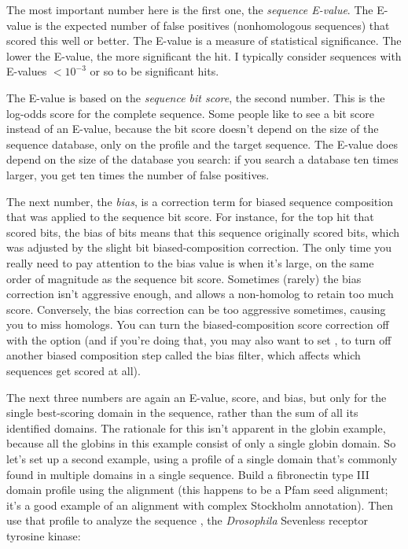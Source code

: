 The most important number here is the first one, the \emph{sequence
  E-value}. The E-value is the expected number of false positives
(nonhomologous sequences) that scored this well or better.  The
E-value is a measure of statistical significance. The lower the
E-value, the more significant the hit.  I typically consider
sequences with E-values $< 10^{-3}$ or so to be significant hits.

The E-value is based on the \emph{sequence bit score}, the second
number. This is the log-odds score for the complete sequence.  Some
people like to see a bit score instead of an E-value, because the bit
score doesn't depend on the size of the sequence database, only on the
profile and the target sequence. The E-value does depend on the
size of the database you search: if you search a database ten times
larger, you get ten times the number of false positives.

The next number, the \emph{bias}, is a correction term for biased
sequence composition that was applied to the sequence bit
score.
For instance, for the top hit \mono{\SGUseqname{}}
that scored \SGUbitscore{} bits, the bias of \SGUbias{} bits means
that this sequence originally scored \SGUorigscore{} bits, which was adjusted by
the slight \SGUbias{} bit biased-composition correction. The only time you
really need to pay attention to the bias value is when it's large, on
the same order of magnitude as the sequence bit score. Sometimes
(rarely) the bias correction isn't aggressive enough, and allows a
non-homolog to retain too much score. Conversely, the bias correction
can be too aggressive sometimes, causing you to miss homologs. You can
turn the biased-composition score correction off with the
 option (and if you're doing that, you may also want
to set , to turn off another biased composition step
called the bias filter, which affects which sequences get scored at
all).

The next three numbers are again an E-value, score, and bias, but only
for the single best-scoring domain in the sequence, rather than the
sum of all its identified domains. The rationale for this isn't
apparent in the globin example, because all the globins in this
example consist of only a single globin domain. So let's set up a
second example, using a profile of a single domain that's commonly found
in multiple domains in a single sequence. Build a fibronectin type III
domain profile using the  alignment (this happens
to be a Pfam seed alignment; it's a good example of an alignment with
complex Stockholm annotation). Then use that profile to analyze the
sequence , the \emph{Drosophila} Sevenless
receptor tyrosine kinase:

